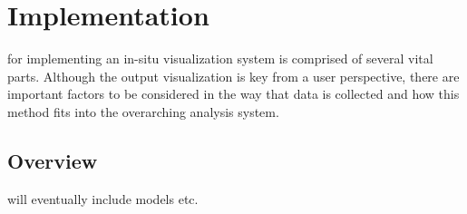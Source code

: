 \chapter{Implementation}
\label{sec:implementation}
 for implementing an in-situ visualization system is comprised of several vital parts. Although the  output visualization is key from a user perspective, there are important factors to be considered in the way that data is collected and how this method fits into the overarching analysis system. 
 
\section{Overview}
\label{sec:overview}
 will eventually include models etc.